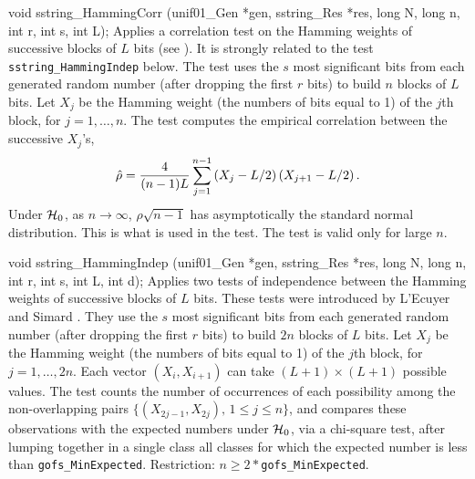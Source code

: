 void sstring_HammingCorr (unif01_Gen *gen, sstring_Res *res,
                          long N, long n, int r, int s, int L);
\endcode
 \tab
  Applies a correlation test on the Hamming weights
  of successive blocks of $L$ bits (see \cite{rLEC99e}).
%
%
%
  It is strongly related to the test {\tt sstring\_HammingIndep} below.
  The test uses the $s$ most significant bits from each generated random
  number (after dropping the first $r$ bits) to build $n$ blocks of $L$ bits.
  Let $X_j$ be the Hamming weight (the numbers of bits equal to 1)
  of the $j$th block, for $j=1,\dots,n$.
  The test computes the empirical correlation between the
  successive  $X_j$'s,
 $$
  \hat\rho = {4 \over (n-1) L } \sum_{j=1}^{n-1}
      \left(X_j -  L/2\right) \left(X_{j+1} - L/2\right).
 $$
  Under $\mathcal{H}_0$, as $n\to\infty$, $\hat\rho \sqrt{n-1}$ has asymptotically
  the standard normal distribution.
  This is what is used in the test.
  The test is valid only for large $n$.
 \endtab
\code


void sstring_HammingIndep (unif01_Gen *gen, sstring_Res *res,
                           long N, long n, int r, int s, int L, int d);
\endcode
 \tab
  Applies two tests of independence between the Hamming weights
  of successive blocks of $L$ bits.
%
%
%
  These tests were introduced by L'Ecuyer and Simard \cite{rLEC99e}.
  They use the $s$ most significant bits from each generated random number
  (after dropping the first $r$ bits)  to  build $2n$ blocks of $L$ bits.
  Let $X_j$ be the Hamming weight (the numbers of bits equal to 1)
  of the $j$th block, for $j=1,\dots,2n$.
  Each vector $(X_i, X_{i+1})$ can take $(L+1)\times(L+1)$ possible
  values.  The test counts the number of occurrences of each possibility
  among the non-overlapping pairs $\{(X_{2j-1}, X_{2j}),\, 1\le j\le n\}$,
  and compares these observations with the expected numbers under $\mathcal{H}_0$,
  via a chi-square test, after lumping together in a single class
  all classes for which the expected number is less than
  {\tt gofs\_MinExpected}.  Restriction: $n \ge 2*${\tt gofs\_MinExpected}.


